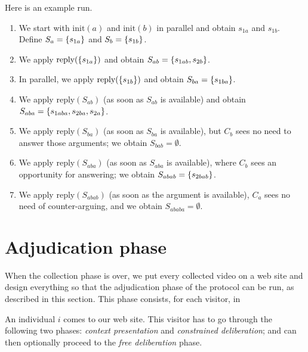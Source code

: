 \documentclass[version=3.21, pagesize, twoside=off, bibliography=totoc, DIV=calc, fontsize=12pt, a4paper]{scrartcl}
\begin{document}
\begin{example}
Here is an example run.
\begin{enumerate}
	\item We start with $\text{init}(a)$ and $\text{init}(b)$ in parallel and obtain $s_{1a}$ and $s_{1b}$. Define $S_{a} = \{s_{1a}\}$ and $S_{b} = \{s_{1b}\}$.
	\item We apply $\text{reply}(\{s_{1a}\})$ and obtain $S_{ab} = \{s_{1ab}, s_{2b}\}$.
	\item In parallel, we apply $\text{reply}(\{s_{1b}\})$ and obtain $S_{ba} = \{s_{1ba}\}$.
	\item We apply $\text{reply}(S_{ab})$ (as soon as $S_{ab}$ is available) and obtain $S_{aba} = \{s_{1aba}, s_{2ba}, s_{2a}\}$.
	\item We apply $\text{reply}(S_{ba})$ (as soon as $S_{ba}$ is available), but $C_b$ sees no need to answer those arguments; we obtain $S_{bab} = \emptyset$.
	\item We apply $\text{reply}(S_{aba})$ (as soon as $S_{aba}$ is available), where $C_b$ sees an opportunity for answering; we obtain $S_{abab} = \{s_{2bab}\}$.
	\item We apply $\text{reply}(S_{abab})$ (as soon as the argument is available), $C_a$ sees no need of counter-arguing, and we obtain $S_{ababa} = \emptyset$.
\end{enumerate}
\end{example}

\section{Adjudication phase}
When the collection phase is over, we put every collected video on a web site and design everything so that the adjudication phase of the protocol can be run, as described in this section. This phase consists, for each visitor, in 

An individual $i$ comes to our web site. This visitor has to go through the following two phases: \emph{context presentation} and \emph{constrained deliberation}; and can then optionally proceed to the \emph{free deliberation} phase.
\end{document}
